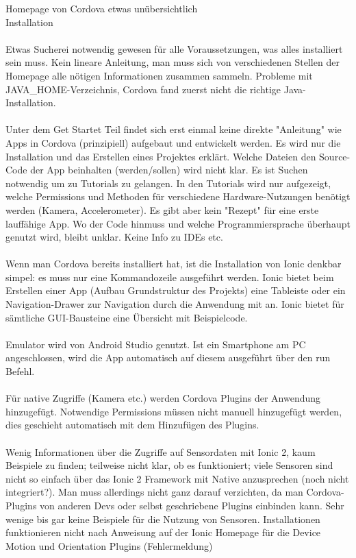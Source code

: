 Homepage von Cordova etwas unübersichtlich
\\
Installation
\\
\\
Etwas Sucherei notwendig gewesen für alle Voraussetzungen, was alles installiert sein muss. Kein lineare Anleitung, man muss sich von verschiedenen Stellen der Homepage alle nötigen Informationen zusammen sammeln. Probleme mit JAVA_HOME-Verzeichnis, Cordova fand zuerst nicht die richtige Java-Installation. 
\\
\\
Unter dem Get Startet Teil findet sich erst einmal keine direkte "Anleitung" wie Apps in Cordova (prinzipiell) aufgebaut und entwickelt werden. Es wird nur die Installation und das Erstellen eines Projektes erklärt. Welche Dateien den Source-Code der App beinhalten (werden/sollen) wird nicht klar. Es ist Suchen notwendig um zu Tutorials zu gelangen. In den Tutorials wird nur aufgezeigt, welche Permissions und Methoden für verschiedene Hardware-Nutzungen benötigt werden (Kamera, Accelerometer). Es gibt aber kein "Rezept" für eine erste lauffähige App. Wo der Code hinmuss und welche Programmiersprache überhaupt genutzt wird, bleibt unklar. Keine Info zu IDEs etc. 
\\
\\
Wenn man Cordova bereits installiert hat, ist die Installation von Ionic denkbar simpel: es muss nur eine Kommandozeile ausgeführt werden. Ionic bietet beim Erstellen einer App (Aufbau Grundstruktur des Projekts) eine Tableiste oder ein Navigation-Drawer zur Navigation durch die Anwendung mit an. Ionic bietet für sämtliche GUI-Bausteine eine Übersicht mit Beispielcode. 
\\
\\
Emulator wird von Android Studio genutzt. Ist ein Smartphone am PC angeschlossen, wird die App automatisch auf diesem ausgeführt über den run Befehl. 
\\
\\
Für native Zugriffe (Kamera etc.) werden Cordova Plugins der Anwendung hinzugefügt. Notwendige Permissions müssen nicht manuell hinzugefügt werden, dies geschieht automatisch mit dem Hinzufügen des Plugins.
\\
\\
Wenig Informationen über die Zugriffe auf Sensordaten mit Ionic 2, kaum Beispiele zu finden; teilweise nicht klar, ob es funktioniert; viele Sensoren sind nicht so einfach über das Ionic 2 Framework mit Native anzusprechen (noch nicht integriert?). Man muss allerdings nicht ganz darauf verzichten, da man Cordova-Plugins von anderen Devs oder selbst geschriebene Plugins einbinden kann. Sehr wenige bis gar keine Beispiele für die Nutzung von Sensoren.
Installationen funktionieren nicht nach Anweisung auf der Ionic Homepage für die Device Motion und Orientation Plugins (Fehlermeldung)

